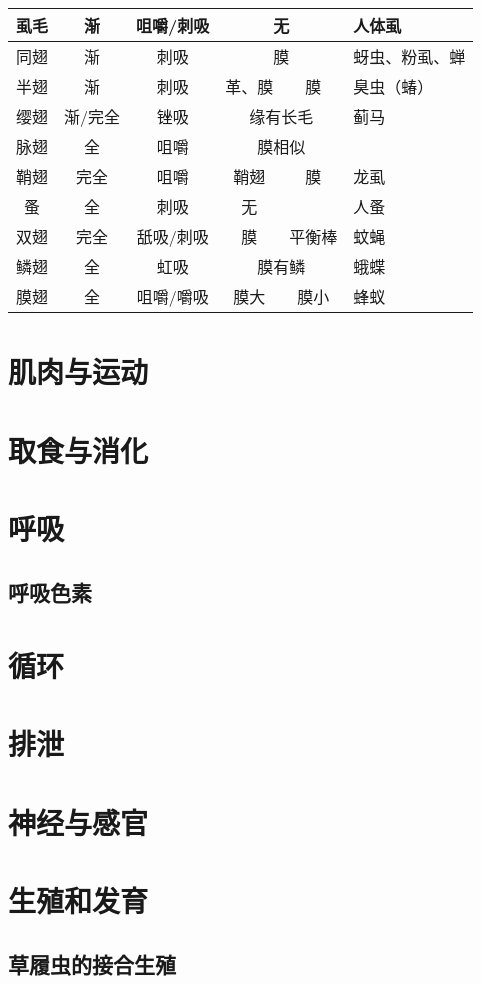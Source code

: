\begin{table}[]
\begin{tabular}{|c|c|c|cc|l|}
		虱毛 & 渐 & 咀嚼/刺吸 & \multicolumn{2}{c|}{无} & 人体虱 \\ \hline
		同翅 & 渐 & 刺吸 & \multicolumn{2}{c|}{膜} & 蚜虫、粉虱、蝉 \\ \hline
		半翅 & 渐 & 刺吸 & \multicolumn{1}{c|}{革、膜} & 膜 & 臭虫（蝽） \\ \hline
		缨翅 & 渐/完全 & 锉吸 & \multicolumn{2}{c|}{缘有长毛} & 蓟马 \\ \hline
		脉翅 & 全 & 咀嚼 & \multicolumn{2}{c|}{膜相似} &  \\ \hline
		鞘翅 & 完全 & 咀嚼 & \multicolumn{1}{c|}{鞘翅} & 膜 & 龙虱 \\ \hline
		蚤 & 全 & 刺吸 & \multicolumn{1}{c|}{无} &  & 人蚤 \\ \hline
		双翅 & 完全 & 舐吸/刺吸 & \multicolumn{1}{c|}{膜} & 平衡棒 & 蚊蝇 \\ \hline
		鳞翅 & 全 & 虹吸 & \multicolumn{2}{c|}{膜有鳞} & 蛾蝶 \\ \hline
		膜翅 & 全 & 咀嚼/嚼吸 & \multicolumn{1}{c|}{膜大} & 膜小 & 蜂蚁 \\ \hline
	\end{tabular}
	\caption{}
	\label{tab:my-table}
\end{table}

\section{肌肉与运动}

\section{取食与消化}



\section{呼吸}

\subsection{呼吸色素}



\section{循环}

\section{排泄}

\section{神经与感官}

\section{生殖和发育}

\subsection{草履虫的接合生殖}

